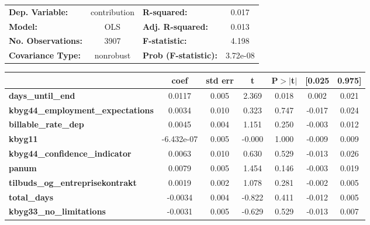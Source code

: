 \begin{center}
\begin{tabular}{lclc}
\toprule
\textbf{Dep. Variable:}                   &  contribution & \textbf{  R-squared:         } &     0.017   \\
\textbf{Model:}                           &      OLS      & \textbf{  Adj. R-squared:    } &     0.013   \\
\textbf{No. Observations:}                &       3907    & \textbf{  F-statistic:       } &     4.198   \\
\textbf{Covariance Type:}                 &   nonrobust   & \textbf{  Prob (F-statistic):} &  3.72e-08   \\
\bottomrule
\end{tabular}
\begin{tabular}{lcccccc}
                                          & \textbf{coef} & \textbf{std err} & \textbf{t} & \textbf{P$> |$t$|$} & \textbf{[0.025} & \textbf{0.975]}  \\
\midrule
\textbf{days\_until\_end}                 &       0.0117  &        0.005     &     2.369  &         0.018        &        0.002    &        0.021     \\
\textbf{kbyg44\_employment\_expectations} &       0.0034  &        0.010     &     0.323  &         0.747        &       -0.017    &        0.024     \\
\textbf{billable\_rate\_dep}              &       0.0045  &        0.004     &     1.151  &         0.250        &       -0.003    &        0.012     \\
\textbf{kbyg11}                           &   -6.432e-07  &        0.005     &    -0.000  &         1.000        &       -0.009    &        0.009     \\
\textbf{kbyg44\_confidence\_indicator}    &       0.0063  &        0.010     &     0.630  &         0.529        &       -0.013    &        0.026     \\
\textbf{panum}                            &       0.0079  &        0.005     &     1.454  &         0.146        &       -0.003    &        0.019     \\
\textbf{tilbuds\_og\_entreprisekontrakt}  &       0.0019  &        0.002     &     1.078  &         0.281        &       -0.002    &        0.005     \\
\textbf{total\_days}                      &      -0.0034  &        0.004     &    -0.822  &         0.411        &       -0.012    &        0.005     \\
\textbf{kbyg33\_no\_limitations}          &      -0.0031  &        0.005     &    -0.629  &         0.529        &       -0.013    &        0.007     \\

\end{tabular}
\end{center}
